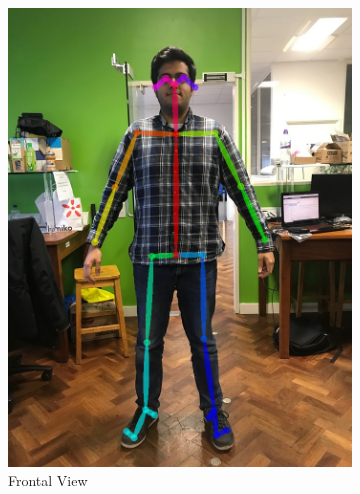 \begin{figure}[ht]
    \begin{subfigure}[b]{.32\textwidth}
        \centering
        \includegraphics[width=1.0\linewidth]{img/chapter5_implementation/shreyFront.png}
        \caption{Frontal View}
    \end{subfigure}%
    \hspace{\fill} 
    \begin{subfigure}[b]{.32\textwidth}
        \centering

\end{subfigure}
\end{figure}
